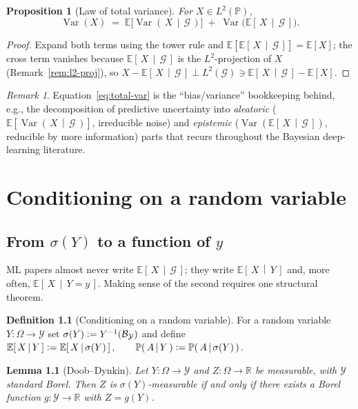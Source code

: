 \documentclass[11pt,oneside]{report}
\theoremstyle{plain}
\newtheorem{proposition}[theorem]{Proposition}
\newtheorem{lemma}[theorem]{Lemma}
\theoremstyle{definition}
\newtheorem{definition}[theorem]{Definition}
\theoremstyle{remark}
\newtheorem{remark}[theorem]{Remark}
\newcommand{\R}{\mathbb{R}}
\newcommand{\Prob}{\mathbb{P}}
\newcommand{\E}{\mathbb{E}}
\newcommand{\Gcal}{\mathcal{G}}
\newcommand{\Bcal}{\mathcal{B}}
\newcommand{\Ycal}{\mathcal{Y}}
\newcommand{\defeq}{\vcentcolon=}
\DeclareMathOperator{\Var}{Var}
\newcommand{\cE}[2]{\E\!\left[\,#1 \,\middle|\, #2\,\right]}
\newcommand{\cProb}[2]{\Prob\!\left(\,#1 \,\middle|\, #2\,\right)}
\newcommand{\cVar}[2]{\Var\!\left(\,#1 \,\middle|\, #2\,\right)}
\numberwithin{equation}{chapter}
\begin{document}
\begin{proposition}[Law of total variance]\label{prop:total-var}
For $X\in L^2(\Prob)$,
\begin{equation}\label{eq:total-var}
  \Var(X)\;=\;\E\bigl[\cVar{X}{\Gcal}\bigr]
            \;+\;\Var\bigl(\cE{X}{\Gcal}\bigr).
\end{equation}
\end{proposition}
\begin{proof}
Expand both terms using the tower rule and
$\E[\cE{X}{\Gcal}]=\E[X]$; the cross term vanishes because
$\cE{X}{\Gcal}$ is the $L^2$-projection of $X$ (Remark~\ref{rem:l2-proj}),
so $X-\cE{X}{\Gcal}\perp L^2(\Gcal)\ni\cE{X}{\Gcal}-\E[X]$.
\end{proof}

\begin{remark}
Equation~\eqref{eq:total-var} is the ``bias/variance'' bookkeeping behind,
e.g., the decomposition of predictive uncertainty into \emph{aleatoric}
($\E[\cVar{X}{\Gcal}]$, irreducible noise) and \emph{epistemic}
($\Var(\cE{X}{\Gcal})$, reducible by more information) parts that recurs
throughout the Bayesian deep-learning literature.
\end{remark}

\chapter{Conditioning on a random variable}\label{ch:cond-on-rv}

\section{From \texorpdfstring{$\sigma(Y)$}{sigma(Y)} to a function of \texorpdfstring{$y$}{y}}
\label{sec:cond-on-rv}

ML papers almost never write $\cE{X}{\Gcal}$; they write $\cE{X}{Y}$ and,
more often, $\cE{X}{Y=y}$. Making sense of the second requires one
structural theorem.

\begin{definition}[Conditioning on a random variable]
For a random variable $Y:\Omega\to\Ycal$ set $\sigma(Y)\defeq
Y^{-1}(\Bcal_\Ycal)$ and define
\(
  \cE{X}{Y}\defeq\cE{X}{\sigma(Y)},\qquad
  \cProb{A}{Y}\defeq\cProb{A}{\sigma(Y)}.
\)
\end{definition}

\begin{lemma}[Doob--Dynkin]\label{lem:doob-dynkin}
Let $Y:\Omega\to\Ycal$ and $Z:\Omega\to\R$ be measurable, with $\Ycal$
standard Borel. Then $Z$ is $\sigma(Y)$-measurable if and only if there
exists a Borel function $g:\Ycal\to\R$ with $Z=g(Y)$.
\end{lemma}
\end{document}
